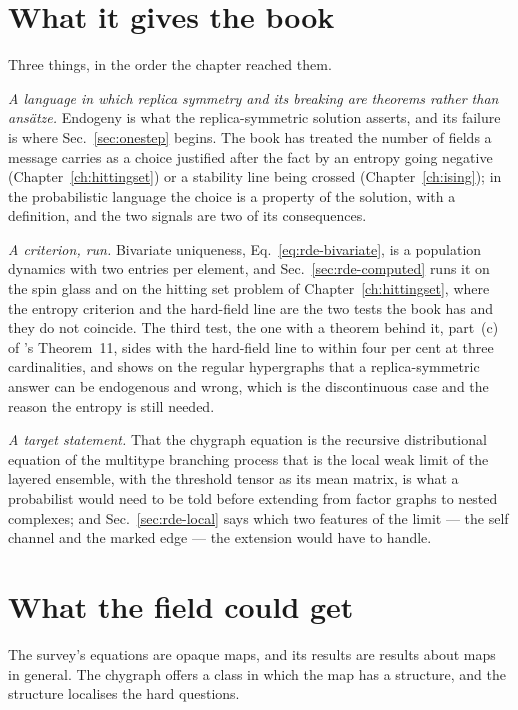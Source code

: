 \section{What it gives the book}
\label{sec:rde-gives}

Three things, in the order the chapter reached them.

\emph{A language in which replica symmetry and its breaking are theorems
rather than ans\"atze.} Endogeny is what the replica-symmetric solution
asserts, and its failure is where Sec.~\ref{sec:onestep} begins. The book
has treated the number of fields a message carries as a choice justified
after the fact by an entropy going negative (Chapter~\ref{ch:hittingset})
or a stability line being crossed (Chapter~\ref{ch:ising}); in the
probabilistic language the choice is a property of the solution, with a
definition, and the two signals are two of its consequences.

\emph{A criterion, run.} Bivariate uniqueness,
Eq.~\eqref{eq:rde-bivariate}, is a population dynamics with two entries
per element, and Sec.~\ref{sec:rde-computed} runs it on the spin glass and
on the hitting set problem of Chapter~\ref{ch:hittingset}, where the
entropy criterion and the hard-field line are the two tests the book has
and they do not coincide. The third test, the one with a theorem behind it,
part~(c) of \citeauthor{aldous2005}'s Theorem~11, sides with the
hard-field line to within four per cent at three cardinalities, and shows
on the regular hypergraphs that a replica-symmetric answer can be
endogenous and wrong, which is the discontinuous case and the reason the
entropy is still needed.

\emph{A target statement.} That the chygraph equation is the recursive
distributional equation of the multitype branching process that is the
local weak limit of the layered ensemble, with the threshold tensor as its
mean matrix, is what a probabilist would need to be told before extending
\citet{dembo2013} from factor graphs to nested complexes; and
Sec.~\ref{sec:rde-local} says which two features of the limit --- the self
channel and the marked edge --- the extension would have to handle.

\section{What the field could get}
\label{sec:rde-field}

The survey's equations are opaque maps, and its results are results about
maps in general. The chygraph offers a class in which the map has a
structure, and the structure localises the hard questions.


